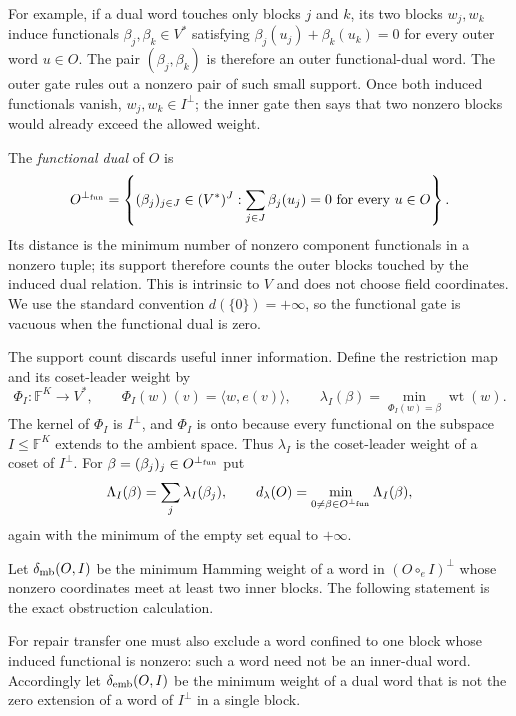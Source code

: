 \documentclass[11pt]{article}
\theoremstyle{definition}
\theoremstyle{remark}
\newcommand{\F}{\mathbb{F}}
\newcommand{\wt}{\operatorname{wt}}
\begin{document}
For example, if a dual word touches only blocks $j$ and $k$, its two blocks
$w_j,w_k$ induce functionals $\beta_j,\beta_k\in V^*$ satisfying
$\beta_j(u_j)+\beta_k(u_k)=0$ for every outer word $u\in O$.  The pair
$(\beta_j,\beta_k)$ is therefore an outer functional-dual word.  The outer
gate rules out a nonzero pair of such small support.  Once both induced
functionals vanish, $w_j,w_k\in I^\perp$; the inner gate then says that two
nonzero blocks would already exceed the allowed weight.

The \emph{functional dual} of $O$ is
\[
 O^{\perp_{\rm fun}}=
 \left\{(\beta_j)_{j\in J}\in(V^*)^J:
       \sum_{j\in J}\beta_j(u_j)=0\text{ for every }u\in O\right\}.
\]
Its distance is the minimum number of nonzero component functionals in a
nonzero tuple; its support therefore counts the outer blocks touched by the
induced dual relation.  This is intrinsic to $V$ and does not choose field
coordinates.  We use the standard convention $d(\{0\})=+\infty$, so the
functional gate is vacuous when the functional dual is zero.

The support count discards useful inner information.  Define the restriction
map and its coset-leader weight by
\[
 \Phi_I:\F^K\longrightarrow V^*,\qquad
 \Phi_I(w)(v)=\langle w,e(v)\rangle,
 \qquad
 \lambda_I(\beta)=\min_{\Phi_I(w)=\beta}\wt(w).
\]
The kernel of $\Phi_I$ is $I^\perp$, and $\Phi_I$ is onto because every
functional on the subspace $I\leq\F^K$ extends to the ambient space.  Thus
$\lambda_I$ is the coset-leader weight of a coset of $I^\perp$.  For
$\beta=(\beta_j)_j\in O^{\perp_{\rm fun}}$ put
\[
 \Lambda_I(\beta)=\sum_j\lambda_I(\beta_j),\qquad
 d_\lambda(O)=\min_{0\ne\beta\in O^{\perp_{\rm fun}}}\Lambda_I(\beta),
\]
again with the minimum of the empty set equal to $+\infty$.

Let $\delta_{\rm mb}(O,I)$ be the minimum Hamming weight of a word in
$(O\circ_e I)^\perp$ whose nonzero coordinates meet at least two inner
blocks.  The following statement is the exact obstruction calculation.

For repair transfer one must also exclude a word confined to one block whose
induced functional is nonzero: such a word need not be an inner-dual word.
Accordingly let $\delta_{\rm emb}(O,I)$ be the minimum weight of a dual word
that is not the zero extension of a word of $I^\perp$ in a single block.
\end{document}

